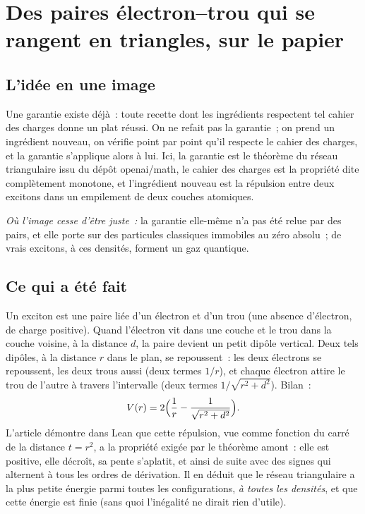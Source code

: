 \chapter[Des excitons en triangles]{Des paires électron--trou qui se rangent en triangles, sur le papier}

\section*{L'idée en une image}

\begin{analogie}
Une garantie existe déjà~: \og toute recette dont les ingrédients respectent tel cahier des charges donne un plat
réussi\fg. On ne refait pas la garantie~; on prend un ingrédient nouveau, on vérifie point par point qu'il respecte
le cahier des charges, et la garantie s'applique alors à lui. Ici, la garantie est le théorème du réseau
triangulaire issu du dépôt openai/math, le cahier des charges est la propriété dite \og complètement monotone\fg, et
l'ingrédient nouveau est la répulsion entre deux excitons dans un empilement de deux couches atomiques.

\emph{Où l'image cesse d'être juste~:} la garantie elle-même n'a pas été relue par des pairs, et elle porte sur des
particules classiques immobiles au zéro absolu~; de vrais excitons, à ces densités, forment un gaz quantique.
\end{analogie}

\section*{Ce qui a été fait}

Un exciton est une paire liée d'un électron et d'un \og trou\fg{} (une absence d'électron, de charge positive).
Quand l'électron vit dans une couche et le trou dans la couche voisine, à la distance $d$, la paire devient un
petit dipôle vertical. Deux tels dipôles, à la distance $r$ dans le plan, se repoussent~: les deux électrons se
repoussent, les deux trous aussi (deux termes $1/r$), et chaque électron attire le trou de l'autre à travers
l'intervalle (deux termes $1/\sqrt{r^2+d^2}$). Bilan~:
\[
V(r)=2\Bigl(\frac1r-\frac1{\sqrt{r^2+d^2}}\Bigr).
\]
L'article démontre dans Lean que cette répulsion, vue comme fonction du carré de la distance $t=r^2$, a la
propriété exigée par le théorème amont~: elle est positive, elle décroît, sa pente s'aplatit, et ainsi de suite
avec des signes qui alternent à tous les ordres de dérivation. Il en déduit que le réseau triangulaire a la plus
petite énergie parmi toutes les configurations, \emph{à toutes les densités}, et que cette énergie est finie (sans
quoi l'inégalité ne dirait rien d'utile).

